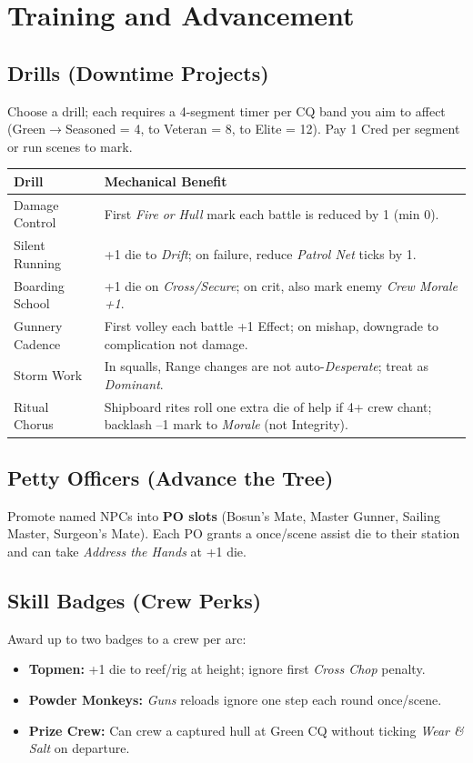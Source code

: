 \documentclass[11pt,oneside]{book}
\newcommand{\tagpill}[1]{\begingroup
  \setlength{\fboxsep}{1pt}\color{black}\fbox{\footnotesize\textsf{#1}}
\endgroup}
\begin{document}
\section{Training and Advancement}

\subsection*{Drills (Downtime Projects)}
Choose a drill; each requires a 4-segment timer per CQ band you aim to affect (Green$\rightarrow$Seasoned = 4, to Veteran = 8, to Elite = 12). Pay 1 Cred per segment or run scenes to mark.
\begin{tabularx}{\linewidth}{@{}p{3.4cm} X@{}}
\toprule
\textbf{Drill} & \textbf{Mechanical Benefit}\\
\midrule
Damage Control & First \textit{Fire} \emph{or} \textit{Hull} mark each battle is reduced by 1 (min 0).\\
Silent Running & +1 die to \emph{Drift}; on failure, reduce \textit{Patrol Net} ticks by 1.\\
Boarding School & +1 die on \emph{Cross/Secure}; on crit, also mark enemy \textit{Crew Morale +1}.\\
Gunnery Cadence & First volley each battle +1 Effect; on mishap, downgrade to complication not damage.\\
Storm Work & In squalls, Range changes are not auto-\emph{Desperate}; treat as \emph{Dominant}.\\
Ritual Chorus & Shipboard rites roll one extra die of help if 4+ crew chant; backlash --1 mark to \textit{Morale} (not Integrity).\\
\bottomrule
\end{tabularx}

\subsection*{Petty Officers (Advance the Tree)}
Promote named NPCs into \textbf{PO slots} (Bosun's Mate, Master Gunner, Sailing Master, Surgeon's Mate). Each PO grants a once/scene assist die to their station and can take \textit{Address the Hands} at +1 die.

\subsection*{Skill Badges (Crew Perks)}
Award up to two badges to a crew per arc:
\begin{itemize}
  \item \textbf{Topmen:} +1 die to reef/rig at height; ignore first \textit{Cross Chop} penalty. 
  \item \textbf{Powder Monkeys:} \emph{Guns} reloads ignore one \tagpill{RELOAD} step each round once/scene.
  \item \textbf{Prize Crew:} Can crew a captured hull at Green CQ without ticking \textit{Wear \& Salt} on departure.
\end{itemize}
\end{document}

